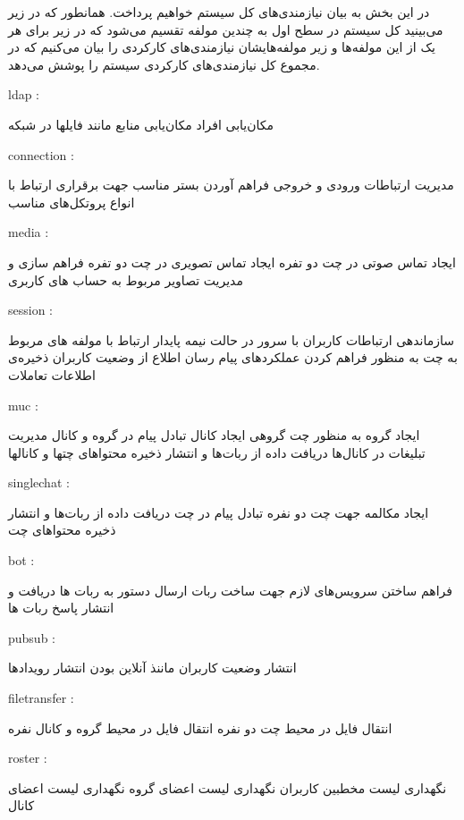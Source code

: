 
در این بخش به بیان نیازمندی‌های کل سیستم خواهیم پرداخت. همانطور که در زیر می‌بینید کل سیستم در سطح اول به چندین مولفه تقسیم می‌شود که در زیر برای هر یک از این مولفه‌ها و زیر مولفه‌هایشان نیازمندی‌های کارکردی را بیان می‌کنیم که در مجموع کل نیازمندی‌های کارکردی سیستم را پوشش می‌دهد.
\begin{itemize}
 ldap : 
\begin{itemize}
 مکان‌یابی افراد
 مکان‌یابی منابع مانند فایلها در شبکه 
\end{itemize}
   connection :
\begin{itemize}
  مدیریت ارتباطات ورودی و خروجی
 فراهم آوردن بستر مناسب جهت برقراری ارتباط با انواع پروتکل‌های مناسب
\end{itemize}
 media : 
\begin{itemize}
	 ایجاد تماس صوتی در چت دو تفره
	 ایجاد تماس تصویری در چت دو تفره
	 فراهم سازی و مدیریت تصاویر مربوط به حساب های کاربری
	
\end{itemize}
  session :
\begin{itemize}
	 سازماندهی ارتباطات کاربران با سرور در حالت نیمه پایدار
	 ارتباط با مولفه های مربوط به چت به منظور فراهم کردن عملکردهای پیام رسان
	 اطلاع از وضعیت کاربران
	 ذخیره‌ی اطلاعات تعاملات
\end{itemize}

 muc : 
\begin{itemize}
 ایجاد گروه به منظور چت گروهی
 ایجاد کانال
 تبادل پیام در گروه و کانال
 مدیریت تبلیغات در کانال‌ها
 دریافت داده از ربات‌ها و انتشار
 ذخیره محتواهای چتها و کانالها
\end{itemize}

 singlechat :

\begin{itemize}
 ایجاد مکالمه جهت چت دو نفره
 تبادل پیام در چت
 دریافت داده از ربات‌ها و انتشار
 ذخیره محتواهای چت 

\end{itemize}
 bot : 
\begin{itemize}
 فراهم ساختن سرویس‌های لازم جهت ساخت ربات
 ارسال دستور به ربات ها
 دریافت و انتشار پاسخ ربات ها
\end{itemize}

 pubsub :
\begin{itemize}
 انتشار وضعیت کاربران ماننذ آنلاین بودن
 انتشار رویدادها
\end{itemize}
  filetransfer : 
\begin{itemize}
 انتقال فایل در محیط چت دو نفره
 انتقال فایل در محیط گروه و کانال نفره
\end{itemize}
 roster :
\begin{itemize}
 نگهداری لیست مخطبین کاربران
 نگهداری لیست اعضای گروه
 نگهداری لیست اعضای کانال
\end{itemize}


\end{itemize}
